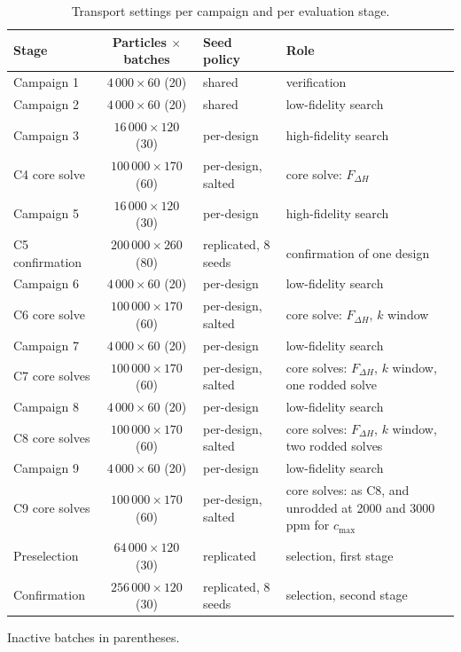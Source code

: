 \begin{table}[htbp]
  \centering
  \begin{threeparttable}
  \caption{Transport settings per campaign and per evaluation stage.}
  \label{tab:fidelity}
  \small
  \begin{tabularx}{\textwidth}{@{}>{\raggedright\arraybackslash}p{}c>{\raggedright\arraybackslash}p{}>{\raggedright\arraybackslash}X@{}}
    \toprule
    Stage & Particles $\times$ batches\tnote{a} & Seed policy & Role \\
    \midrule
    Campaign 1     & $4\,000\times60$ (20)    & shared              & verification \\
    Campaign 2     & $4\,000\times60$ (20)    & shared              & low-fidelity search \\
    Campaign 3     & $16\,000\times120$ (30)  & per-design          & high-fidelity search \\
    C4 core solve  & $100\,000\times170$ (60) & per-design, salted  & core solve: $F_{\Delta H}$ \\
    Campaign 5     & $16\,000\times120$ (30)  & per-design          & high-fidelity search \\
    C5 confirmation & $200\,000\times260$ (80) & replicated, 8 seeds & confirmation of one design \\
    Campaign 6     & $4\,000\times60$ (20)    & per-design          & low-fidelity search \\
    C6 core solve  & $100\,000\times170$ (60) & per-design, salted  & core solve: $F_{\Delta H}$, $k$ window \\
    Campaign 7     & $4\,000\times60$ (20)    & per-design          & low-fidelity search \\
    C7 core solves & $100\,000\times170$ (60) & per-design, salted  & core solves: $F_{\Delta H}$, $k$ window, one rodded solve \\
    Campaign 8     & $4\,000\times60$ (20)    & per-design          & low-fidelity search \\
    C8 core solves & $100\,000\times170$ (60) & per-design, salted  & core solves: $F_{\Delta H}$, $k$ window, two rodded solves \\
    Campaign 9     & $4\,000\times60$ (20)    & per-design          & low-fidelity search \\
    C9 core solves & $100\,000\times170$ (60) & per-design, salted  & core solves: as C8, and unrodded at 2000 and 3000\,ppm for $c_\mathrm{max}$ \\
    Preselection   & $64\,000\times120$ (30)  & replicated          & selection, first stage \\
    Confirmation   & $256\,000\times120$ (30) & replicated, 8 seeds & selection, second stage \\
    \bottomrule
  \end{tabularx}
  \begin{tablenotes}[flushleft]\footnotesize
    \item[a] Inactive batches in parentheses.
  \end{tablenotes}
  \end{threeparttable}
\end{table}

